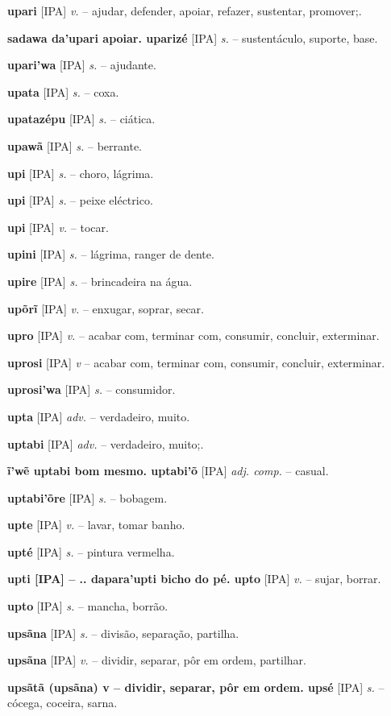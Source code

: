 \textbf{upari} [IPA] \textit{v.} -- ajudar, defender, apoiar, refazer, sustentar, promover;.

\textbf{sadawa da'upari apoiar. uparizé} [IPA] \textit{s.} -- sustentáculo, suporte, base.

\textbf{upari'wa} [IPA] \textit{s.} -- ajudante.

\textbf{upata} [IPA] \textit{s.} -- coxa.

\textbf{upatazépu} [IPA] \textit{s.} -- ciática.

\textbf{upawã} [IPA] \textit{s.} -- berrante.

\textbf{upi} [IPA] \textit{s.} -- choro, lágrima.

\textbf{upi} [IPA] \textit{s.} -- peixe eléctrico.

\textbf{upi} [IPA] \textit{v.} -- tocar.

\textbf{upini} [IPA] \textit{s.} -- lágrima, ranger de dente.

\textbf{upire} [IPA] \textit{s.} -- brincadeira na água.

\textbf{upõrĩ} [IPA] \textit{v.} -- enxugar, soprar, secar.

\textbf{upro} [IPA] \textit{v.} -- acabar com, terminar com, consumir, concluir, exterminar.

\textbf{uprosi} [IPA] \textit{v} -- acabar com, terminar com, consumir, concluir, exterminar.

\textbf{uprosi'wa} [IPA] \textit{s.} -- consumidor.

\textbf{upta} [IPA] \textit{adv.} -- verdadeiro, muito.

\textbf{uptabi} [IPA] \textit{adv.} -- verdadeiro, muito;.

\textbf{ĩ'wẽ uptabi bom mesmo. uptabi'õ} [IPA] \textit{adj. comp.} -- casual.

\textbf{uptabi'õre} [IPA] \textit{s.} -- bobagem.

\textbf{upte} [IPA] \textit{v.} -- lavar, tomar banho.

\textbf{upté} [IPA] \textit{s.} -- pintura vermelha.

\textbf{upti [IPA]  -- .. dapara'upti bicho do pé. upto} [IPA] \textit{v.} -- sujar, borrar.

\textbf{upto} [IPA] \textit{s.} -- mancha, borrão.

\textbf{upsãna} [IPA] \textit{s.} -- divisão, separação, partilha.

\textbf{upsãna} [IPA] \textit{v.} -- dividir, separar, pôr em ordem, partilhar.

\textbf{upsãtã (upsãna) v -- dividir, separar, pôr em ordem. upsé} [IPA] \textit{s.} -- cócega, coceira, sarna.

